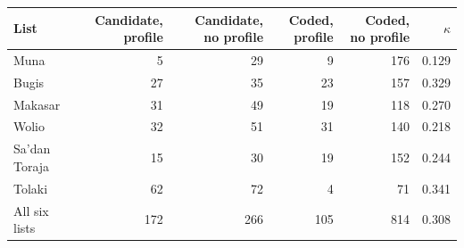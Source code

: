 \begin{tabular}{lrrrrr}
\toprule
List & Candidate, profile & Candidate, no profile & Coded, profile & Coded, no profile & $\kappa$ \\
\midrule
Muna & 5 & 29 & 9 & 176 & 0.129 \\
Bugis & 27 & 35 & 23 & 157 & 0.329 \\
Makasar & 31 & 49 & 19 & 118 & 0.270 \\
Wolio & 32 & 51 & 31 & 140 & 0.218 \\
Sa'dan Toraja & 15 & 30 & 19 & 152 & 0.244 \\
Tolaki & 62 & 72 & 4 & 71 & 0.341 \\
\midrule
All six lists & 172 & 266 & 105 & 814 & 0.308 \\
\bottomrule
\end{tabular}
